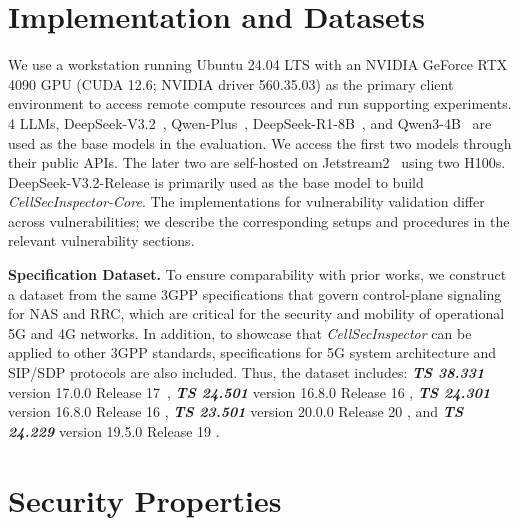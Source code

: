 \documentclass[sigconf]{acmart}
\newcommand{\lm}{\textit{CellSecInspector}\xspace}
\newcommand{\core}{\textit{CellSecInspector-Core}\xspace}
\begin{document}
{%
\section{Implementation and Datasets} 
\label{append:implementation-datasets}
We use a workstation running Ubuntu 24.04 LTS with an NVIDIA GeForce RTX 4090 GPU (CUDA 12.6; NVIDIA driver 560.35.03) as the primary client environment to access remote compute resources and run supporting experiments. 4 LLMs, DeepSeek-V3.2~\cite{deepseek_v32_release_2025}, Qwen-Plus~\cite{qwen_plus_modelstudio_2026}, DeepSeek-R1-8B~\cite{deepseek_r1_distill_llama8b_2025}, and Qwen3-4B~\cite{qwen3_4b_instruct_2507} are used as the base models in the evaluation. We access the first two models through their public APIs. The later two are self-hosted on Jetstream2~\cite{jetstream2025llminference} using two H100s. DeepSeek-V3.2-Release is primarily used as the base model to build \core.  
The implementations for vulnerability validation differ across vulnerabilities; we describe the corresponding setups and procedures in the relevant vulnerability sections. 


\noindent \textbf{Specification Dataset.} To ensure comparability with prior works, we construct a dataset from the same 3GPP specifications that govern control-plane signaling for NAS and RRC, which are critical for the security and mobility of operational 5G and 4G networks. In addition, to showcase that \lm can be applied to other 3GPP standards, specifications for 5G system architecture and SIP/SDP protocols are also included.
Thus, the dataset includes: \textbf{\textit{TS 38.331}} version 17.0.0 Release 17~\cite{3GPP_TS_38331}, \textbf{\textit{TS 24.501}} version 16.8.0 Release 16 \cite{3GPP_TS_24501}, \textbf{\textit{TS 24.301}} version 16.8.0 Release 16 \cite{3GPP_TS_24301}, \textbf{\textit{TS 23.501}} version 20.0.0 Release 20 \cite{3GPP_TS_23501}, and \textbf{\textit{TS 24.229}} version 19.5.0 Release 19 \cite{ETSI-TS-124229}.  


\clearpage

\section{Security Properties}
\label{append:securityproperties}

}
\end{document}

